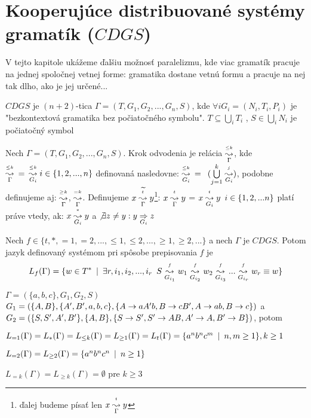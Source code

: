 \chapter{Kooperujúce distribuované systémy gramatík ($CDGS$)}

V tejto kapitole ukážeme ďalšiu možnosť paralelizmu, kde viac gramatík pracuje na jednej
spoločnej vetnej forme: gramatika dostane vetnú formu a pracuje na nej tak dlho, ako je
jej určené...

\begin{definicia}
$CDGS$ je $(n+2)$-tica $\Gamma = (T,G_1,G_2,...,G_n,S)$, kde $ \forall i G_i = (
N_i,T_i,P_i)$ je "bezkontextová gramatika bez počiatočného symbolu". $T\subseteq
\underset{i}\bigcup T_i$ , $S \in \underset{i}\bigcup N_i$ je počiatočný symbol
\end{definicia}

\begin{definicia}
Nech $\Gamma = (T,G_1,G_2,...,G_n,S)$. Krok odvodenia je relácia $\krok{\leq k}{\Gamma}$,
kde $\krok{\leq k}{\Gamma}\med = \med\krok{\leq k}{G_i}i\in \{1,2,...,n\}$
definovaná nasledovne: $\krok{\leq k}{G_i}\med =\med (\underset{j=1} {\overset{k}\bigcup}
 \krok{j}{G_i})$, podobne definujeme aj: $\krok{\geq k}{\Gamma}$, $\krok{=k}{\Gamma} $.
Definujeme $x\krok{\widetilde{t}}{\Gamma}y$\footnote{ďalej budeme písať len $x
\krok{t}{\Gamma}y$ }: $x\krok{t}{\Gamma}y$ = $x\krok{t}{G_i} y\med i\in \{1,2,...n\}$
platí práve vtedy, ak: $x \krok{*}{G_i}y$ a $\not\exists z \not = y:
y\underset{G_i}\Ra z$
\end{definicia}

\begin{definicia}
Nech $f \in \{ t,*,=1,=2,...,\leq 1,\leq 2,...,\geq 1,\geq 2,...\}$ a nech $\Gamma$ je
$CDGS$. Potom jazyk definovaný systémom pri spôsobe prepisovania $f$ je
\[
L_f(\Gamma)=\{w \in T^* \mm \exists r,i_1,i_2,...,i_r\med S\krok{f}{G_{i_1}}w_1
\krok{f}{G_{i_2}}w_2 \krok{f}{G_{i_3}}...\krok{f}{G_{i_r}}w_r\equiv w\}
\]
\end{definicia}

\begin{priklad}
$\Gamma = (\{a,b,c\},G_1,G_2,S)$\\ $G_1 = (\{A,B\},\{A',B',a,b,c\},\{A\ra aA'b,B\ra
cB',A\ra ab, B\ra c\})$ a\\
$G_2 = (\{S,S',A',B'\},\{A,B\},\{S\ra S',S'\ra AB,A'\ra A,
B'\ra B\})$, potom
\begin{description}
\item{}$L_{=1}(\Gamma)=L_{*}(\Gamma)=L_{\leq k}(\Gamma)=L_{\geq 1}(\Gamma)=L_{t}(\Gamma)=
\{a^n b^n c^m \mm n,m\geq 1\}, k\geq 1$
\item{}$L_{=2}(\Gamma)=L_{\geq 2}(\Gamma)=\{a^n b^n c^n \mm n\geq 1 \}$
\item{}$L_{=k}(\Gamma)=L_{\geq k}(\Gamma)=\emptyset$ pre $k\geq 3$
\end{description}
\end{priklad}

